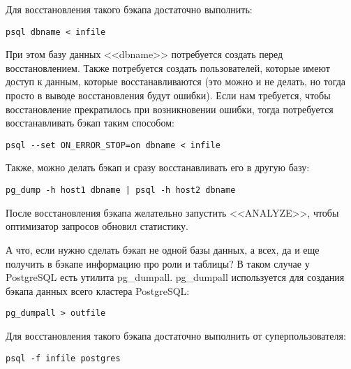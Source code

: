 Для восстановления такого бэкапа достаточно выполнить:
\begin{lstlisting}[label=lst:backups2,caption=Восстанавливаем бэкап]
psql dbname < infile
\end{lstlisting}

При этом базу данных <<dbname>> потребуется создать перед восстановлением. Также потребуется создать пользователей, 
которые имеют доступ к данным, которые восстанавливаются (это можно и не делать, но тогда просто в выводе восстановления будут ошибки).
Если нам требуется, чтобы восстановление прекратилось при возникновении ошибки, тогда потребуется восстанавливать бэкап таким способом:
\begin{lstlisting}[label=lst:backups3,caption=Восстанавливаем бэкап]
psql --set ON_ERROR_STOP=on dbname < infile
\end{lstlisting}

Также, можно делать бэкап и сразу восстанавливать его в другую базу:
\begin{lstlisting}[label=lst:backups4,caption=Бекап в другую БД]
pg_dump -h host1 dbname | psql -h host2 dbname
\end{lstlisting}

После восстановления бэкапа желательно запустить <<ANALYZE>>, чтобы оптимизатор запросов обновил статистику.

А что, если нужно сделать бэкап не одной базы данных, а всех, да и еще получить в бэкапе информацию про роли и таблицы? 
В таком случае у PostgreSQL есть утилита pg\_dumpall. pg\_dumpall используется для создания бэкапа данных всего кластера PostgreSQL:
\begin{lstlisting}[label=lst:backups5,caption=Бекап кластера PostgreSQL]
pg_dumpall > outfile
\end{lstlisting}

Для восстановления такого бэкапа достаточно выполнить от суперпользователя:
\begin{lstlisting}[label=lst:backups6,caption=Восстановления бэкапа PostgreSQL]
psql -f infile postgres
\end{lstlisting}

